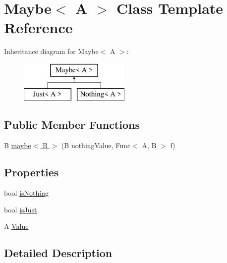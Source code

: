 \hypertarget{class_maybe_3_01_a_01_4}{\section{Maybe$<$ A $>$ Class Template Reference}
\label{class_maybe_3_01_a_01_4}
}
Inheritance diagram for Maybe$<$ A $>$\+:\begin{figure}[H]
\begin{center}
\leavevmode
\includegraphics[height=2.000000cm]{class_maybe_3_01_a_01_4}
\end{center}
\end{figure}
\subsection*{Public Member Functions}
\begin{DoxyCompactItemize}
\item 
B \hyperlink{class_maybe_3_01_a_01_4_a7980209ae91a5eab6557d399cf06ac2e}{maybe$<$ B $>$} (B nothing\+Value, Func$<$ A, B $>$ f)
\end{DoxyCompactItemize}
\subsection*{Properties}
\begin{DoxyCompactItemize}
\item 
bool \hyperlink{class_maybe_3_01_a_01_4_a2c7a8acaaa66ed34bf9ecfdc4d94377b}{is\+Nothing}
\item 
bool \hyperlink{class_maybe_3_01_a_01_4_a9f9d460c5b2108cfc9291da24bb8d001}{is\+Just}
\item 
A \hyperlink{class_maybe_3_01_a_01_4_a9398da8d668f30dfeb8c0aea0872711e}{Value}
\end{DoxyCompactItemize}


\subsection{Detailed Description}



